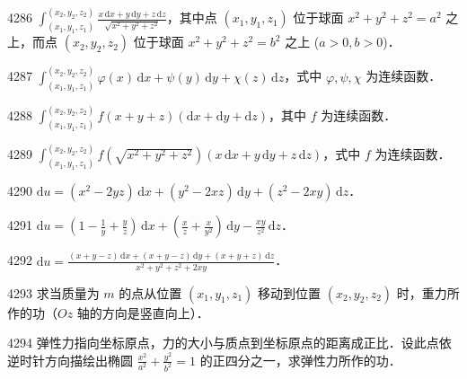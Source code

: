\begin{prob}[M]{4286}
$\displaystyle\int_{(x_1,y_1,z_1)}^{(x_2,y_2,z_2)} \frac{x\,\mathrm{d}x + y\,\mathrm{d}y + z\,\mathrm{d}z}{\sqrt{x^2+y^2+z^2}}$，其中点 $(x_1,y_1,z_1)$ 位于球面 $x^2+y^2+z^2 = a^2$ 之上，而点 $(x_2,y_2,z_2)$ 位于球面 $x^2+y^2+z^2 = b^2$ 之上 ($a > 0, b > 0$)．
\end{prob}

\begin{prob}[S]{4287}
$\displaystyle\int_{(x_1,y_1,z_1)}^{(x_2,y_2,z_2)} \varphi(x)\,\mathrm{d}x + \psi(y)\,\mathrm{d}y + \chi(z)\,\mathrm{d}z$，式中 $\varphi, \psi, \chi$ 为连续函数．
\end{prob}

\begin{prob}[S]{4288}
$\displaystyle\int_{(x_1,y_1,z_1)}^{(x_2,y_2,z_2)} f(x+y+z)(\mathrm{d}x + \mathrm{d}y + \mathrm{d}z)$，其中 $f$ 为连续函数．
\end{prob}

\begin{prob}[S]{4289}
$\displaystyle\int_{(x_1,y_1,z_1)}^{(x_2,y_2,z_2)} f(\sqrt{x^2+y^2+z^2})(x\,\mathrm{d}x + y\,\mathrm{d}y + z\,\mathrm{d}z)$，式中 $f$ 为连续函数．
\end{prob}


\begin{prob}[S]{4290}
$\mathrm{d}u = (x^2 - 2yz)\,\mathrm{d}x + (y^2 - 2xz)\,\mathrm{d}y + (z^2 - 2xy)\,\mathrm{d}z$．
\end{prob}

\begin{prob}[S]{4291}
$\mathrm{d}u = \left(1 - \frac{1}{y} + \frac{y}{z}\right)\,\mathrm{d}x + \left(\frac{x}{z} + \frac{x}{y^2}\right)\,\mathrm{d}y - \frac{xy}{z^2}\,\mathrm{d}z$．
\end{prob}

\begin{prob}[S]{4292}
$\mathrm{d}u = \frac{(x+y-z)\,\mathrm{d}x + (x+y-z)\,\mathrm{d}y + (x+y+z)\,\mathrm{d}z}{x^2+y^2+z^2+2xy}$．
\end{prob}

\begin{prob}[M]{4293}
求当质量为 $m$ 的点从位置 $(x_1,y_1,z_1)$ 移动到位置 $(x_2,y_2,z_2)$ 时，重力所作的功（$Oz$ 轴的方向是竖直向上）．
\end{prob}

\begin{prob}[M]{4294}
弹性力指向坐标原点，力的大小与质点到坐标原点的距离成正比．设此点依逆时针方向描绘出椭圆 $\frac{x^2}{a^2} + \frac{y^2}{b^2} = 1$ 的正四分之一，求弹性力所作的功．
\end{prob}

